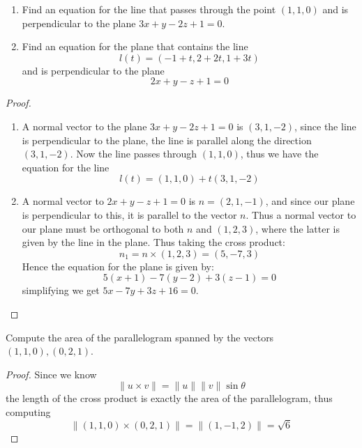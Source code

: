 \documentclass[openany]{book}
\begin{document}
\begin{prob}
    \begin{enumerate}
        \item[(a)] Find an equation for the line that passes through the point $(1,1,0)$ and is perpendicular to the plane $3x+y-2z+1=0$.
        \item[(b)] Find an equation for the plane that contains the line 
        \begin{equation*}
            l(t)=(-1+t, 2+2t, 1+3t)
        \end{equation*}
        and is perpendicular to the plane 
        \begin{equation*}
            2x+y-z+1=0
        \end{equation*}
    \end{enumerate}
\end{prob}
\begin{proof}
    \begin{enumerate}
        \item[(a)] A normal vector to the plane $3x+y-2z+1=0$ is $(3,1,-2)$, since the line is perpendicular to the plane, the line is parallel along the direction $(3,1,-2)$. Now the line passes through $(1,1,0)$, thus we have the equation for the line 
        \begin{equation*}
            l(t)=(1,1,0)+t(3,1,-2)
        \end{equation*}
        \item[(b)] A normal vector to $2x+y-z+1=0$ is $n=(2,1,-1)$, and since our plane is perpendicular to this, it is parallel to the vector $n$. Thus a normal vector to our plane must be orthogonal to both $n$ and $(1,2,3)$, where the latter is given by the line in the plane. Thus taking the cross product:
        \begin{equation*}
            n_1=n\times (1,2,3)=(5,-7,3)
        \end{equation*}
        Hence the equation for the plane is given by:
        \begin{equation*}
            5(x+1)-7(y-2)+3(z-1)=0
        \end{equation*}
        simplifying we get $5x-7y+3z+16=0$.
    \end{enumerate}
\end{proof}

\begin{prob}
    Compute the area of the parallelogram spanned by the vectors $(1,1,0), (0,2,1)$.
\end{prob}
\begin{proof}
    Since we know 
    \begin{equation*}
        \|u\times v\|=\|u\|\|v\|\sin\theta
    \end{equation*}
    the length of the cross product is exactly the area of the parallelogram, thus computing
    \begin{equation*}
        \|(1,1,0)\times(0,2,1)\|=\|(1,-1,2)\|=\sqrt{6}
    \end{equation*}
\end{proof}
\end{document}
